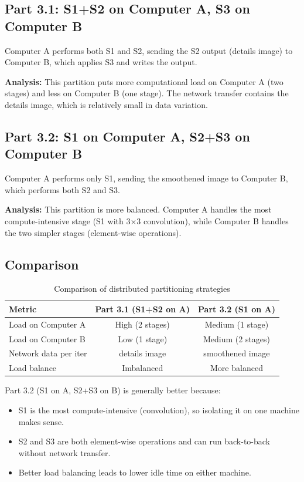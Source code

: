 \documentclass[12pt,a4paper]{article}
\begin{document}
\subsection{Part 3.1: S1+S2 on Computer A, S3 on Computer B}
Computer A performs both S1 and S2, sending the S2 output (details image) to Computer B, which applies S3 and writes the output.

\textbf{Analysis:} This partition puts more computational load on Computer A (two stages) and less on Computer B (one stage). The network transfer contains the details image, which is relatively small in data variation.

\subsection{Part 3.2: S1 on Computer A, S2+S3 on Computer B}
Computer A performs only S1, sending the smoothened image to Computer B, which performs both S2 and S3.

\textbf{Analysis:} This partition is more balanced. Computer A handles the most compute-intensive stage (S1 with 3$\times$3 convolution), while Computer B handles the two simpler stages (element-wise operations).

\subsection{Comparison}
\begin{table}[H]
\centering
\begin{tabular}{lcc}
\toprule
\textbf{Metric} & \textbf{Part 3.1 (S1+S2 on A)} & \textbf{Part 3.2 (S1 on A)} \\
\midrule
Load on Computer A & High (2 stages) & Medium (1 stage) \\
Load on Computer B & Low (1 stage) & Medium (2 stages) \\
Network data per iter & details image & smoothened image \\
Load balance & Imbalanced & More balanced \\
\bottomrule
\end{tabular}
\caption{Comparison of distributed partitioning strategies}
\end{table}

Part 3.2 (S1 on A, S2+S3 on B) is generally better because:
\begin{itemize}
    \item S1 is the most compute-intensive (convolution), so isolating it on one machine makes sense.
    \item S2 and S3 are both element-wise operations and can run back-to-back without network transfer.
    \item Better load balancing leads to lower idle time on either machine.
\end{itemize}
\end{document}
